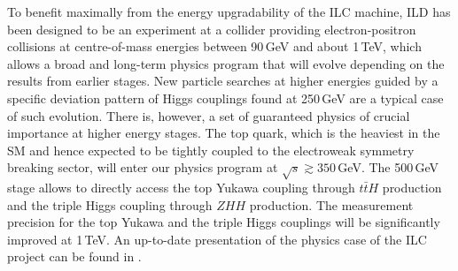 To benefit maximally from the energy upgradability of the ILC machine, ILD has been designed to be an experiment at a collider providing electron-positron collisions at centre-of-mass energies between 90\,GeV and about 1\,TeV, which allows a broad and long-term physics program that will evolve depending on the results from earlier stages. New particle searches at higher energies guided by a specific deviation pattern of Higgs couplings found at 250\,GeV are a typical case of such evolution. There is, however, a set of guaranteed physics of crucial importance at higher energy stages. The top quark, which is the heaviest in the SM and hence expected to be tightly coupled to the electroweak symmetry breaking sector, will enter our physics program at $\sqrt{s} \gtrsim 350$\,GeV. The 500\,GeV stage allows to directly access the top Yukawa coupling through $t\bar{t}H$ production and the triple Higgs coupling through $ZHH$ production. The measurement precision for the top Yukawa and the triple Higgs couplings will be significantly improved at 1\,TeV. An up-to-date presentation of the physics case of the ILC project can be found in
\cite{Ref:ILCESU1}.
%

